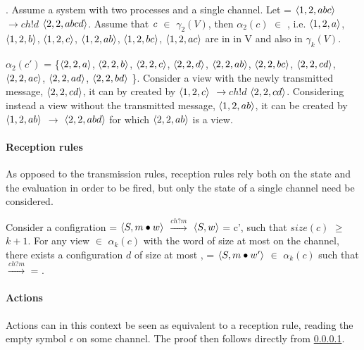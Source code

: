 . Assume a system with two processes and a single channel. Let  = $\langle1,2,abc\rangle$ $\rightarrow{ch!d}$ $\langle2,2,abcd\rangle$. Assume that $\emph{c}$ $\in$ $\gamma_2(V)$, then $\alpha_2(c)$ $\in$ , i.e. 
$\langle1,2,a\rangle$, $\langle1,2,b\rangle$, $\langle1,2,c\rangle$, $\langle1,2,ab\rangle$, $\langle1,2,bc\rangle$, $\langle1,2,ac\rangle$ are in in V and also in $\gamma_k(V)$.

$\alpha_2(c')$ = \{$\langle2,2,a\rangle$, $\langle2,2,b\rangle$, $\langle2,2,c\rangle$, $\langle2,2,d\rangle$, $\langle2,2,ab\rangle$, $\langle2,2,bc\rangle$, $\langle2,2,cd\rangle$, $\langle2,2,ac\rangle$, $\langle2,2,ad\rangle$, $\langle2,2,bd\rangle $ \}. Consider a view with the newly transmitted message, $\langle2,2,cd\rangle$, it can by created by $\langle1,2,c\rangle$ $\rightarrow{ch!d}$ $\langle2,2,cd\rangle$. Considering instead a view without the transmitted message, $\langle1,2,ab\rangle$, it can be created by $\langle1,2,ab\rangle$ $\rightarrow$ $\langle2,2,abd\rangle$ for which $\langle2,2,ab\rangle$ is a view.

\paragraph{Reception rules}
\label{proofreception}
As opposed to the transmission rules, reception rules rely both on the state and the evaluation in order to be fired, but only the state of a single channel need be considered.

Consider a configration  = $\langle S, m\bullet w\rangle$ $\xrightarrow{ch?m}$ $\langle S, w\rangle$ = c', such that $size(c)$ $\geq$ $k+1$. For any view  $\in$ $\alpha_k(c)$ with the word  of size at most  on the channel, there exists a configuration $d$ of size at most ,  = $\langle S, m\bullet w'\rangle$ $\in$ $\alpha_k(c)$ such that  $\xrightarrow{ch?m}$  = .


\paragraph{Actions}
Actions can in this context be seen as equivalent to a reception rule, reading the empty symbol $\epsilon$ on some channel. The proof then follows directly from \ref{proofreception}.
